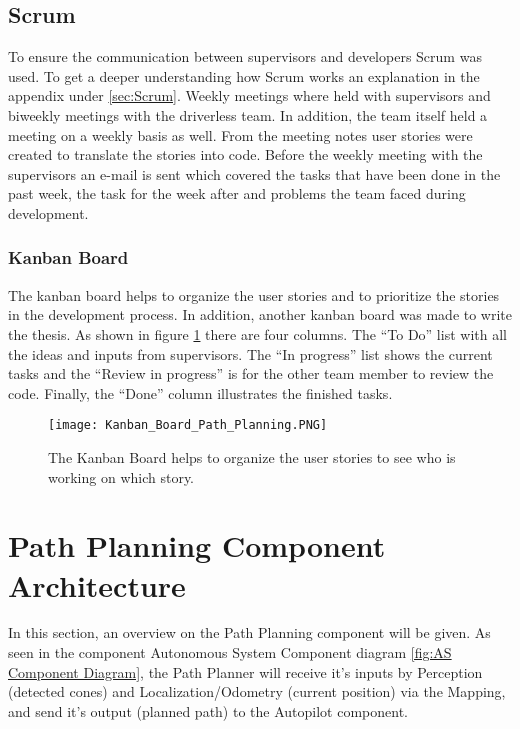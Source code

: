 \subsection{Scrum} \label{sec:Planning Method: Scrum}
To ensure the communication between supervisors and developers Scrum was used. To get a deeper understanding how Scrum works an explanation in the appendix under \ref{sec:Scrum}. Weekly meetings where held with supervisors and biweekly meetings with the driverless team. In addition, the team itself held a meeting on a weekly basis as well. From the meeting notes user stories were created to translate the stories into code. Before the weekly meeting with the supervisors an e-mail is sent which covered the tasks that have been done in the past week, the task for the week after and problems the team faced during development.

\subsubsection{Kanban Board} \label{sec:Kanban Board}
The kanban board helps to organize the user stories and to prioritize the stories in the development process. In addition, another kanban board was made to write the thesis. As shown in figure \ref{fig:Kanban Board Path Planning} there are four columns. The ``To Do'' list with all the ideas and inputs from supervisors. The ``In progress'' list shows the current tasks and the ``Review in progress'' is for the other team member to review the code. Finally, the ``Done'' column illustrates the finished tasks.
\begin{figure}[H]
    \centering
    \texttt{[image: Kanban\_Board\_Path\_Planning.PNG]}
    \caption{The Kanban Board helps to organize the user stories to see who is working on which story.}
    \label{fig:Kanban Board Path Planning}
\end{figure}

\section{Path Planning Component Architecture} \label{sec:Path Planning Component Architecture}
In this section, an overview on the Path Planning component will be given. As seen in the component Autonomous System Component diagram \ref{fig:AS Component Diagram}, the Path Planner will receive it's inputs by Perception (detected cones) and Localization/Odometry (current position) via the Mapping, and send it's output (planned path) to the Autopilot component.

